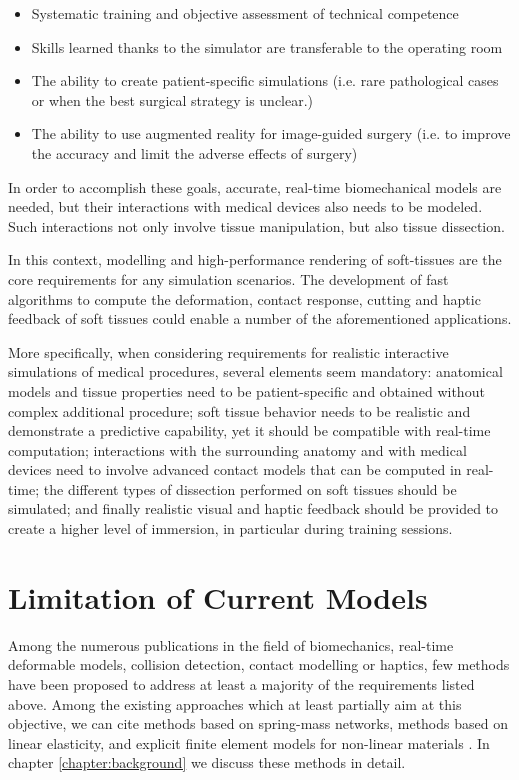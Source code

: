 \begin{itemize}
 \item Systematic training and objective assessment of technical competence
 \item Skills learned thanks to the simulator are transferable to the operating room
 \item The ability to create patient-specific simulations (i.e. rare pathological cases or when the best surgical strategy is unclear.)
 \item The ability to use augmented reality for image-guided surgery (i.e. to improve the accuracy and limit the adverse effects of surgery)
\end{itemize}

In order to accomplish these goals, accurate, real-time biomechanical models are needed, but their interactions with medical devices also needs to be modeled.
Such interactions not only involve tissue manipulation, but also tissue dissection. 

In this context, modelling and high-performance rendering of soft-tissues are the core requirements for any simulation scenarios. 
The development of fast algorithms to compute the deformation, contact response, cutting and haptic feedback of soft tissues could enable a number of the 
aforementioned applications.

More specifically, when considering requirements for realistic interactive simulations of medical procedures, several elements seem mandatory: anatomical 
models and tissue properties need to be patient-specific and obtained without complex additional procedure; soft tissue behavior needs to be realistic and 
demonstrate a predictive capability, yet it should be compatible with real-time computation; interactions with the surrounding anatomy and with medical 
devices need to involve advanced contact models that can be computed in real-time; the different types of dissection performed on soft tissues should be 
simulated; and finally realistic visual and haptic feedback should be provided to create a higher level of immersion, in particular during training sessions.

\section{Limitation of Current Models}
Among the numerous publications in the field of biomechanics, real-time deformable models, collision detection, contact modelling or haptics, 
few methods have been proposed to address at least a majority of the requirements listed above. Among the existing approaches which at least 
partially aim at this objective, we can cite methods based on spring-mass networks, methods based on linear elasticity, and explicit finite element models 
for non-linear materials \cite{Gibson1997a,Meier2005}. In chapter \ref{chapter:background} we discuss these methods in detail.  

